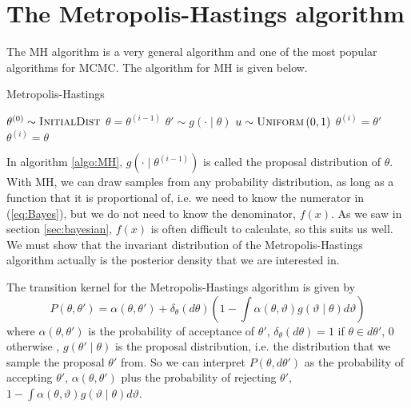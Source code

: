 \section{The Metropolis-Hastings algorithm}\label{subsec:mh}
The MH algorithm is a very general algorithm and one of the most popular algorithms for MCMC. 
The algorithm for MH is given below.
\begin{algorithm}[H]\label{algo:MH}
    \caption{Metropolis-Hastings}
    \label{algo:MH}
    \begin{algorithmic}[1] %
        \State $\theta^{\left(0\right)} \sim \textsc{InitialDist}$ 
        \State $\theta = \theta^{\left(i - 1\right)}$
        \State$\theta' \sim g\left(\cdot \mid \theta\right)$
        \State $u\sim \textsc{Uniform}\left(0,1\right)$
        \State $\theta^{\left(i\right)} = \theta'$
        \Else 
        \State $\theta^{\left(i\right)} = \theta$
         \EndIf
         \EndFor
    \end{algorithmic}
\end{algorithm}
In algorithm \ref{algo:MH}, $g\left(\cdot \mid \theta^{\left(i-1\right)}\right)$ is called the proposal distribution of $\theta$. 
With MH, we can draw samples from any probability distribution, as long as a function that it is proportional of, i.e. we need to know the numerator in (\ref{eq:Bayes}), but we do not need to know the denominator, $f\left(x\right)$.
As we saw in section \ref{sec:bayesian}, $f\left(x\right)$ is often difficult to calculate, so this suits us well. 
We must show that the invariant distribution of the Metropolis-Hastings algorithm actually is the posterior density that we are interested in.

The transition kernel for the Metropolis-Hastings algorithm is given by
\begin{equation}
    P\left(\theta, \theta'\right) = \alpha\left(\theta, \theta'\right) + \delta_{\theta} \left(d\theta\right)\left(1 - \int \alpha\left(\theta, \vartheta\right)g\left(\vartheta\mid \theta\right) d \vartheta \right)
\end{equation}
where $\alpha\left(\theta, \theta'\right)$ is the probability of acceptance of $\theta'$, $\delta_{\theta}\left(d\theta\right) = 1$ if  $\theta \in d\theta'$, $0$ otherwise \cite{chib1995understanding},  $g\left(\theta'\mid \theta\right)$ is the proposal distribution, i.e. the distribution that we sample the proposal $\theta'$ from. 
So we can interpret $P\left(\theta , d\theta'\right)$ as the probability of accepting $\theta'$,  $\alpha\left(\theta, \theta'\right)$ plus the probability of rejecting $\theta'$, 
$1 - \int \alpha\left(\theta, \vartheta\right) g\left(\vartheta\mid \theta \right) d\vartheta$. 
